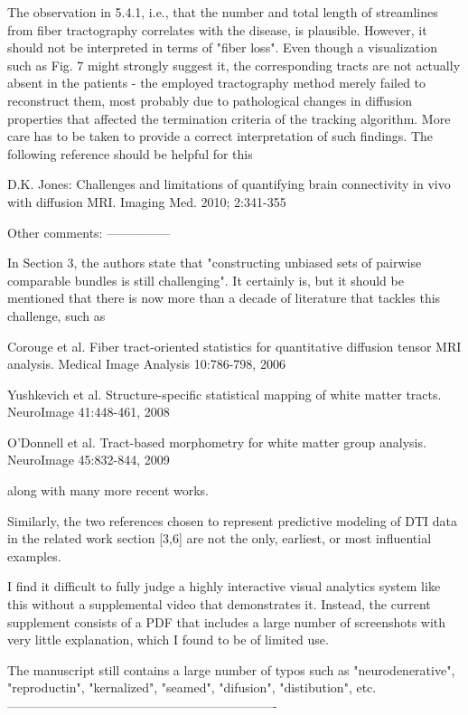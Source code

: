     The observation in 5.4.1, i.e., that the number and total length of streamlines
    from fiber tractography correlates with the disease, is plausible. However, it
    should not be interpreted in terms of "fiber loss". Even though a visualization
    such as Fig. 7 might strongly suggest it, the corresponding tracts are not
    actually absent in the patients - the employed tractography method merely failed
    to reconstruct them, most probably due to pathological changes in diffusion
    properties that affected the termination criteria of the tracking algorithm. More
    care has to be taken to provide a correct interpretation of such findings. The
    following reference should be helpful for this

    D.K. Jones: Challenges and limitations of quantifying brain connectivity in vivo
    with diffusion MRI. Imaging Med. 2010; 2:341-355

    Other comments:
    ---------------

    In Section 3, the authors state that "constructing unbiased sets of pairwise
    comparable bundles is still challenging". It certainly is, but it should be
    mentioned that there is now more than a decade of literature that tackles this
    challenge, such as

    Corouge et al. Fiber tract-oriented statistics for quantitative diffusion tensor
    MRI analysis. Medical Image Analysis 10:786-798, 2006

    Yushkevich et al. Structure-specific statistical mapping of white matter tracts.
    NeuroImage 41:448-461, 2008

    O'Donnell et al. Tract-based morphometry for white matter group analysis.
    NeuroImage 45:832-844, 2009

    along with many more recent works.

    Similarly, the two references chosen to represent predictive modeling of DTI data
    in the related work section [3,6] are not the only, earliest, or most influential
    examples.

    I find it difficult to fully judge a highly interactive visual analytics system
    like this without a supplemental video that demonstrates it. Instead, the current
    supplement consists of a PDF that includes a large number of screenshots with very
    little explanation, which I found to be of limited use.

    The manuscript still contains a large number of typos such as "neurodenerative",
    "reproductin", "kernalized", "seamed", "difusion", "distibution", etc.
----------------------------------------------------------------


